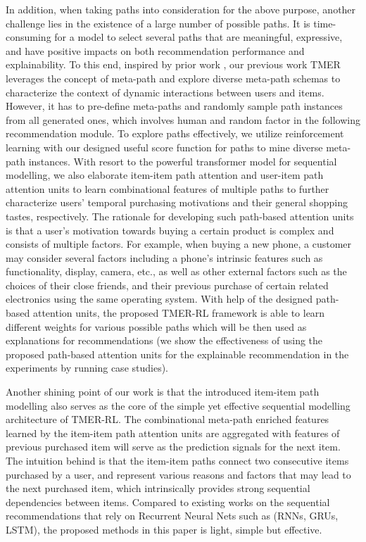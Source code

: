 In addition, when taking paths into consideration for the above purpose, another challenge lies in the existence of a large number of possible paths. It is time-consuming for a model to select several paths that are meaningful, expressive, and have positive impacts on both recommendation performance and explainability.
To this end, inspired by prior work \cite{hu2018leveraging}, our previous work TMER \cite{10.1145/3437963.3441762} leverages the concept of meta-path \cite{sun2011pathsim} and explore diverse meta-path schemas to characterize the context of dynamic interactions between users and items. However, it has to pre-define meta-paths and randomly sample path instances from all generated ones, which involves human and random factor in the following recommendation module. To explore paths effectively, we utilize reinforcement learning with our designed useful score function for paths to mine diverse meta-path instances. With resort to the powerful transformer model for sequential modelling, we also elaborate item-item path attention and user-item path attention units to learn combinational features of multiple paths to further characterize users' temporal purchasing motivations and their general shopping tastes, respectively. The rationale for developing such path-based attention units is that a user's motivation towards buying a certain product is complex and consists of multiple factors. For example, when buying a new phone, a customer may consider several factors including a phone's intrinsic features such as functionality, display, camera, etc., as well as other external factors such as the choices of their close friends, and their previous purchase of certain related electronics using the same operating system. With help of the designed path-based attention units, the proposed TMER-RL framework is able to learn different weights for various possible paths which will be then used as explanations for recommendations (we show the effectiveness of using the proposed path-based attention units for the explainable recommendation in the experiments by running case studies). 

Another shining point of our work is that the introduced item-item path modelling also serves as the core of the simple yet effective sequential modelling architecture of TMER-RL. The combinational meta-path enriched features learned by the item-item path attention units are aggregated with features of previous purchased item will serve as the prediction signals for the next item. The intuition behind is that the item-item paths connect two consecutive items purchased by a user, and represent various reasons and factors that may lead to the next purchased item, which intrinsically provides strong sequential dependencies between items. Compared to existing works on the sequential recommendations that rely on Recurrent Neural Nets such as (RNNs\cite{liu2016context}, GRUs\cite{hidasi2018recurrent}, LSTM\cite{wang2019explainable, zhu2020knowledge}), the proposed methods in this paper is light, simple but effective. 


